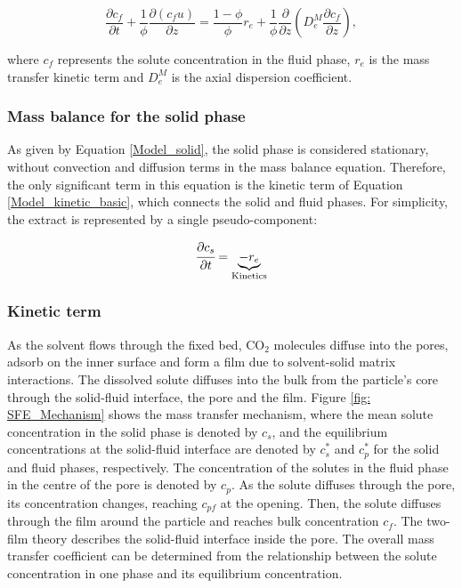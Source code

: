 \documentclass[a4paper,fleqn]{cas-dc}
\begin{document}
	{\footnotesize
		\begin{equation}
			\label{Model_fluid}
			\frac{\partial c_f}{\partial t}
			+ \frac{1}{\phi} \frac{\partial \left( c_f u\right)}{\partial z}
			= \frac{1-\phi}{\phi} r_e
			+ \frac{1}{\phi} \frac{\partial}{\partial z} \left( D^M_e \frac{\partial c_f}{\partial z} \right),
		\end{equation}
	}
	
	where $c_f$ represents the solute concentration in the fluid phase, $r_e$ is the mass transfer kinetic term and $D^M_e$ is the axial dispersion coefficient.
	
	\subsubsection{Mass balance for the solid phase} \label{Mass_balance_solid}
	
	As given by Equation \ref{Model_solid}, the solid phase is considered stationary, without convection and diffusion terms in the mass balance equation. Therefore, the only significant term in this equation is the kinetic term of Equation \ref{Model_kinetic_basic}, which connects the solid and fluid phases. For simplicity, the extract is represented by a single pseudo-component: 
	
	{\footnotesize
		\begin{equation} 
			\label{Model_solid}
			\cfrac{\partial c_s}{\partial t} = \underbrace{-r_e}_{\text{Kinetics}}
	\end{equation} }
	
	\subsubsection{Kinetic term} \label{CH: Kinetic}
	
	As the solvent flows through the fixed bed, CO$_2$ molecules diffuse into the pores, adsorb on the inner surface and form a film due to solvent-solid matrix interactions. The dissolved solute diffuses into the bulk from the particle's core through the solid-fluid interface, the pore and the film. Figure \ref{fig: SFE_Mechanism} shows the mass transfer mechanism, where the mean solute concentration in the solid phase is denoted by $c_s$, and the equilibrium concentrations at the solid-fluid interface are denoted by $c_s^*$ and $c_p^*$ for the solid and fluid phases, respectively. The concentration of the solutes in the fluid phase in the centre of the pore is denoted by $c_p$. As the solute diffuses through the pore, its concentration changes, reaching $c_{pf}$ at the opening. Then, the solute diffuses through the film around the particle and reaches bulk concentration $c_f$. The two-film theory describes the solid-fluid interface inside the pore. The overall mass transfer coefficient can be determined from the relationship between the solute concentration in one phase and its equilibrium concentration.
	
\end{document}
